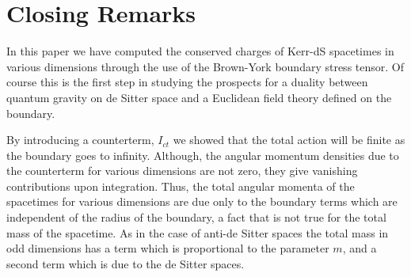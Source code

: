 \documentclass[a4paper,12pt,onecolumn]{revtex4}
\begin{document}
\section{Closing Remarks}

In this paper we have computed the conserved charges of Kerr-dS spacetimes
in various dimensions through the use of the Brown-York boundary stress
tensor. Of course this is the first step in studying the prospects for a
duality between quantum gravity on de Sitter space and a Euclidean field
theory defined on the boundary.

By introducing a counterterm, $I_{ct}$ we showed that the total
action will be finite as the boundary goes to infinity. Although,
the angular momentum densities due to the counterterm for various
dimensions are not zero, they give vanishing contributions upon
integration. Thus, the total angular momenta of the spacetimes for
various dimensions are due only to the boundary terms which are
independent of the radius of the boundary, a fact that is not true
for the total mass of the spacetime. As in the case of anti-de
Sitter spaces the total mass in odd dimensions has a term which is
proportional to the parameter $m$, and a second term which is due
to the de Sitter spaces.
\end{document}
